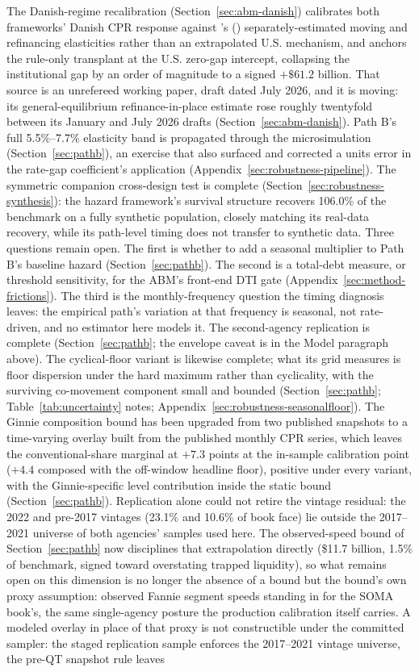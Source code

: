 \documentclass[12pt]{article}
\newcommand{\citepos}[1]{\citeauthor{#1}'s (\citeyear{#1})}
\begin{document}
The Danish-regime recalibration (Section~\ref{sec:abm-danish}) calibrates both frameworks' Danish CPR response against \citepos{berger2026} separately-estimated moving and refinancing elasticities rather than an extrapolated U.S. mechanism, and anchors the rule-only transplant at the U.S. zero-gap intercept, collapsing the institutional gap by an order of magnitude to a signed $+\$61.2$ billion. That source is an unrefereed working paper, draft dated July 2026, and it is moving: its general-equilibrium refinance-in-place estimate rose roughly twentyfold between its January and July 2026 drafts (Section~\ref{sec:abm-danish}). Path B's full 5.5\%--7.7\% elasticity band is propagated through the microsimulation (Section~\ref{sec:pathb}), an exercise that also surfaced and corrected a units error in the rate-gap coefficient's application (Appendix~\ref{sec:robustness-pipeline}). The symmetric companion cross-design test is complete (Section~\ref{sec:robustness-synthesis}): the hazard framework's survival structure recovers 106.0\% of the benchmark on a fully synthetic population, closely matching its real-data recovery, while its path-level timing does not transfer to synthetic data. Three questions remain open. The first is whether to add a seasonal multiplier to Path B's baseline hazard (Section~\ref{sec:pathb}). The second is a total-debt measure, or threshold sensitivity, for the ABM's front-end DTI gate (Appendix~\ref{sec:method-frictions}). The third is the monthly-frequency question the timing diagnosis leaves: the empirical path's variation at that frequency is seasonal, not rate-driven, and no estimator here models it. The second-agency replication is complete (Section~\ref{sec:pathb}; the envelope caveat is in the Model paragraph above). The cyclical-floor variant is likewise complete; what its grid measures is floor dispersion under the hard maximum rather than cyclicality, with the surviving co-movement component small and bounded (Section~\ref{sec:pathb}; Table~\ref{tab:uncertainty} notes; Appendix~\ref{sec:robustness-seasonalfloor}). The Ginnie composition bound has been upgraded from two published snapshots to a time-varying overlay built from the published monthly CPR series, which leaves the conventional-share marginal at $+7.3$ points at the in-sample calibration point ($+4.4$ composed with the off-window headline floor), positive under every variant, with the Ginnie-specific level contribution inside the static bound (Section~\ref{sec:pathb}). Replication alone could not retire the vintage residual: the 2022 and pre-2017 vintages (23.1\% and 10.6\% of book face) lie outside the 2017--2021 universe of both agencies' samples used here. The observed-speed bound of Section~\ref{sec:pathb} now disciplines that extrapolation directly (\$11.7 billion, 1.5\% of benchmark, signed toward overstating trapped liquidity), so what remains open on this dimension is no longer the absence of a bound but the bound's own proxy assumption: observed Fannie segment speeds standing in for the SOMA book's, the same single-agency posture the production calibration itself carries. A modeled overlay in place of that proxy is not constructible under the committed sampler: the staged replication sample enforces the 2017--2021 vintage universe, the pre-QT snapshot rule leaves 
\end{document}
